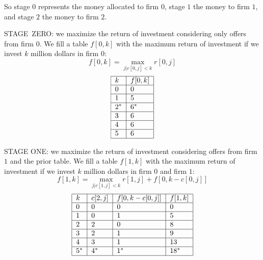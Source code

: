 \documentclass[justified, sixbynine]{tufte-book}
\theoremstyle{plain}%
\newtheorem * {corollary}{Corollary}
\theoremstyle{definition}
\theoremstyle{remark}
\newtheorem * {remark}{Remark}
\newtheorem * {note}{Note}
\begin{document}
\begin{fullwidth}
So stage $0$ represents the money allocated to firm $0$, stage $1$ the money
to firm $1$, and stage $2$ the money to firm $2$.

STAGE\ ZERO: we maximize the return of investment considering only offers
from firm 0. We fill a table $f[0, k]$ with the maximum return of investment
if we invest $k$ million dollars in firm $0$:
\begin{equation}
f[0, k]=\max_{j|c[0, j]<k}r[0, j]  \label{stage0}
\end{equation}
\begin{equation*}
\begin{tabular}{|l|l|}
\hline
$k$ & $f[0, k]$ \\ \hline
0 & 0 \\ \hline
1 & 5 \\ \hline
2$^{ * }$ & 6$^{ * }$ \\ \hline
3 & 6 \\ \hline
4 & 6 \\ \hline
5 & 6 \\ \hline
\end{tabular}
\label{table0}
\end{equation*}

STAGE ONE: we maximize the return of investment considering offers from firm $%
1$ and the prior table. We fill a table $f[1, k]$ with the maximum return of
investment if we invest $k$ million dollars in firm $0$ and firm $1$:
\begin{equation}
f[1, k]=\max_{j|c[1, j]<k}r[1, j]+f[0, k-c[0, j]]  \label{stage1}
\end{equation}
\begin{equation*}
\begin{tabular}{|l|l|l|l|}
\hline
$k$ & $c[2, j]$ & $f[0, k-c[0, j]]$ & $f[1, k]$ \\ \hline
0 & 0 & 0 & 0 \\ \hline
1 & 0 & 1 & 5 \\ \hline
2 & 2 & 0 & 8 \\ \hline
3 & 2 & 1 & 9 \\ \hline
4 & 3 & 1 & 13 \\ \hline
5$^{ * }$ & 4$^{ * }$ & 1$^{ * }$ & 18$^{ * }$ \\ \hline
\end{tabular}
\label{table_stage2}
\end{equation*}


\end{fullwidth}
\end{document}
